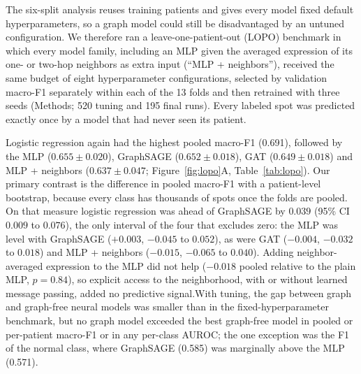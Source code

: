 \documentclass[11pt,letterpaper]{article}
\begin{document}
The six-split analysis reuses training patients and gives every model fixed default hyperparameters, so a graph model could still be disadvantaged by an untuned configuration. We therefore ran a leave-one-patient-out (LOPO) benchmark in which every model family, including an MLP given the averaged expression of its one- or two-hop neighbors as extra input (``MLP + neighbors''), received the same budget of eight hyperparameter configurations, selected by validation macro-F1 separately within each of the 13 folds and then retrained with three seeds (Methods; 520 tuning and 195 final runs). Every labeled spot was predicted exactly once by a model that had never seen its patient.

Logistic regression again had the highest pooled macro-F1 (0.691), followed by the MLP ($0.655 \pm 0.020$), GraphSAGE ($0.652 \pm 0.018$), GAT ($0.649 \pm 0.018$) and MLP + neighbors ($0.637 \pm 0.047$; Figure~\ref{fig:lopo}A, Table~\ref{tab:lopo}). Our primary contrast is the difference in pooled macro-F1 with a patient-level bootstrap, because every class has thousands of spots once the folds are pooled. On that measure logistic regression was ahead of GraphSAGE by $0.039$ (95\% CI $0.009$ to $0.076$), the only interval of the four that excludes zero: the MLP was level with GraphSAGE ($+0.003$, $-0.045$ to $0.052$), as were GAT ($-0.004$, $-0.032$ to $0.018$) and MLP + neighbors ($-0.015$, $-0.065$ to $0.040$). Adding neighbor-averaged expression to the MLP did not help ($-0.018$ pooled relative to the plain MLP, $p = 0.84$), so explicit access to the neighborhood, with or without learned message passing, added no predictive signal.With tuning, the gap between graph and graph-free neural models was smaller than in the fixed-hyperparameter benchmark, but no graph model exceeded the best graph-free model in pooled or per-patient macro-F1 or in any per-class AUROC; the one exception was the F1 of the normal class, where GraphSAGE (0.585) was marginally above the MLP (0.571).
\end{document}
